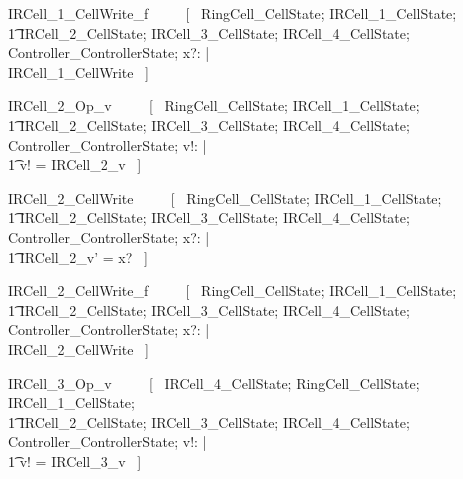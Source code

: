 \documentclass{article}
\begin{document}
\begin{zed}
IRCell\_1\_CellWrite\_f ~~~~ [~ 
    \Xi RingCell\_CellState; 
    \Xi IRCell\_1\_CellState; \\
    \t1 \Xi IRCell\_2\_CellState; 
    \Xi IRCell\_3\_CellState;
    \Xi IRCell\_4\_CellState; 
    \Xi Controller\_ControllerState; 
    x?: \nat | \\
    \lnot \pre IRCell\_1\_CellWrite ~] \\
\end{zed}

\begin{zed}
IRCell\_2\_Op\_v ~~~~ [~ 
    \Xi RingCell\_CellState; 
    \Xi IRCell\_1\_CellState; \\
    \t1 \Xi IRCell\_2\_CellState; 
    \Xi IRCell\_3\_CellState;
    \Xi IRCell\_4\_CellState; 
    \Xi Controller\_ControllerState; v!: \nat | \\
    \t1 v! = IRCell\_2\_v ~] \\
\end{zed}

\begin{zed}
IRCell\_2\_CellWrite ~~~~ [~ 
    \Xi RingCell\_CellState; 
    \Xi IRCell\_1\_CellState; \\
    \t1 \Delta IRCell\_2\_CellState; 
    \Xi IRCell\_3\_CellState;
    \Xi IRCell\_4\_CellState; 
    \Xi Controller\_ControllerState; 
    x?: \nat | \\
    \t1 IRCell\_2\_v' = x? ~] \\
\end{zed}

\begin{zed}
IRCell\_2\_CellWrite\_f ~~~~ [~ 
    \Xi RingCell\_CellState; 
    \Xi IRCell\_1\_CellState; \\
    \t1 \Xi IRCell\_2\_CellState; 
    \Xi IRCell\_3\_CellState;
    \Xi IRCell\_4\_CellState; 
    \Xi Controller\_ControllerState; 
    x?: \nat | \\
    \lnot \pre IRCell\_2\_CellWrite ~] \\
\end{zed}

\begin{zed}
IRCell\_3\_Op\_v ~~~~ [~ 
    \Xi IRCell\_4\_CellState; 
    \Xi RingCell\_CellState; 
    \Xi IRCell\_1\_CellState; \\
    \t1 \Xi IRCell\_2\_CellState; 
    \Xi IRCell\_3\_CellState;
    \Xi IRCell\_4\_CellState; 
    \Xi Controller\_ControllerState; v!: \nat | \\
    \t1 v! = IRCell\_3\_v ~] \\
\end{zed}
\end{document}
